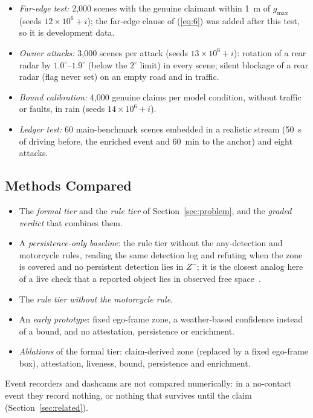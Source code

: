 \begin{itemize}
\item \emph{Far-edge test:} 2,000 scenes with the genuine claimant within 1~m of $g_{\max}$ (seeds \mbox{$12{\times}10^6{+}i$}); the far-edge clause of (\ref{eq:6}) was added after this test, so it is development data.
\item \emph{Owner attacks:} 3,000 scenes per attack (seeds \mbox{$13{\times}10^6{+}i$}): rotation of a rear radar by $1.0^\circ$--$1.9^\circ$ (below the $2^\circ$ limit) in every scene; silent blockage of a rear radar (flag never set) on an empty road and in traffic.
\item \emph{Bound calibration:} 4,000 genuine claims per model condition, without traffic or faults, in rain (seeds \mbox{$14{\times}10^6{+}i$}).
\item \emph{Ledger test:} 60 main-benchmark scenes embedded in a realistic stream (50~s of driving before, the enriched event and 60~min to the anchor) and eight attacks.
\end{itemize}

\subsection{Methods Compared}
\begin{itemize}
\item The \emph{formal tier} and the \emph{rule tier} of Section~\ref{sec:problem}, and the \emph{graded verdict} that combines them.
\item A \emph{persistence-only baseline}: the rule tier without the any-detection and motorcycle rules, reading the same detection log and refuting when the zone is covered and no persistent detection lies in $Z^-$; it is the closest analog here of a live check that a reported object lies in observed free space~\cite{b24,b25}.
\item The \emph{rule tier without the motorcycle rule}.
\item An \emph{early prototype}: fixed ego-frame zone, a weather-based confidence instead of a bound, and no attestation, persistence or enrichment.
\item \emph{Ablations} of the formal tier: claim-derived zone (replaced by a fixed ego-frame box), attestation, liveness, bound, persistence and enrichment.
\end{itemize}
Event recorders and dashcams are not compared numerically: in a no-contact event they record nothing, or nothing that survives until the claim (Section~\ref{sec:related}).

